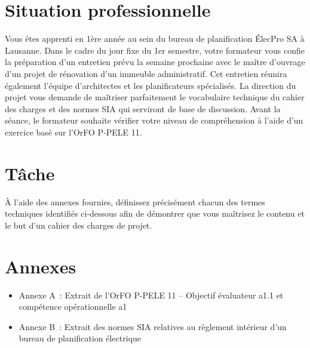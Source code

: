 \documentclass[a4paper,12pt,answers,addpoints]{exam}
\begin{document}
	\unframedsolutions
	\pointsinmargin
	\bracketedpoints


	
	\section*{Situation professionnelle}
	
	Vous êtes apprenti en 1ère année au sein du bureau de planification ÉlecPro SA à Lausanne. Dans le cadre du jour fixe du 1er semestre, votre formateur vous confie la préparation d'un entretien prévu la semaine prochaine avec le maître d'ouvrage d'un projet de rénovation d'un immeuble administratif. Cet entretien réunira également l'équipe d'architectes et les planificateurs spécialisés. La direction du projet vous demande de maîtriser parfaitement le vocabulaire technique du cahier des charges et des normes SIA qui serviront de base de discussion. Avant la séance, le formateur souhaite vérifier votre niveau de compréhension à l'aide d'un exercice basé sur l'OrFO P-PELE 11.
	
	\section*{Tâche}
	
	À l'aide des annexes fournies, définissez précisément chacun des termes techniques identifiés ci-dessous afin de démontrer que vous maîtrisez le contenu et le but d'un cahier des charges de projet.
	
	\section*{Annexes}
	
	\begin{itemize}
		\item Annexe A~: Extrait de l'OrFO P-PELE 11 -- Objectif évaluateur a1.1 et compétence opérationnelle a1
		\item Annexe B~: Extrait des normes SIA relatives au règlement intérieur d'un bureau de planification électrique
	\end{itemize}
	
\end{document}
